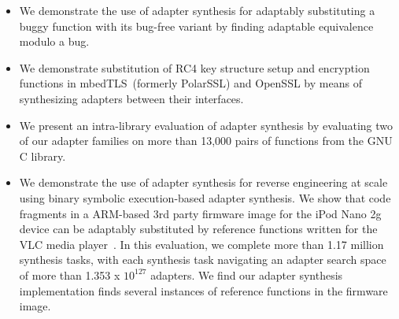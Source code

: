 \begin{itemize}
\item We demonstrate the use of adapter synthesis for adaptably substituting
a buggy function with its bug-free variant by finding 
adaptable equivalence modulo a bug.
%
\item We demonstrate substitution of RC4 key structure
setup and encryption functions in mbedTLS~(formerly PolarSSL) and
OpenSSL by means of synthesizing adapters between their interfaces. 
%
\item We present an intra-library evaluation of adapter synthesis by
evaluating two of our adapter families on more than 13,000 pairs of
functions from the GNU C library.
%
\item We demonstrate the use of adapter synthesis for reverse engineering at
scale using binary symbolic execution-based adapter synthesis.
%
We show that code fragments in a ARM-based 3rd party firmware image for
the iPod Nano 2g device can be adaptably substituted by reference
functions written for the VLC media player~\cite{vlc}.
%
In this evaluation, we complete more than 1.17 million synthesis tasks,
with each synthesis task navigating an adapter search space of more than
1.353 x $10^{127}$ adapters.
%
%
We find our adapter synthesis implementation finds several instances of reference functions in the firmware image.
\end{itemize}

